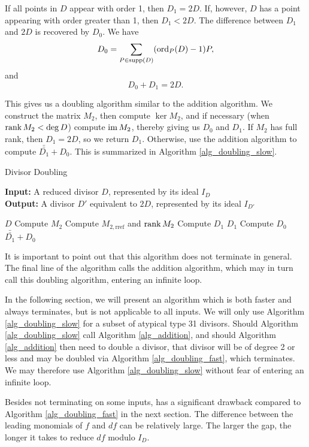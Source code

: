 If all points in $D$ appear with order 1, then $D_1 = 2D$.
If, however, $D$ has a point appearing with order greater than 1, then $D_1 < 2D$.
The difference between $D_1$ and $2D$ is recovered by $D_0$.
We have
\[ D_0 = \sum_{P \in \operatorname{supp}(D)} (\operatorname{ord}_P(D) - 1)P, \]
and
\[ D_0 + D_1 = 2D. \]

This gives us a doubling algorithm similar to the addition algorithm.
We construct the matrix $M_2$, then compute $\ker M_2$, and if necessary (when $\operatorname{rank} M_2 < \deg D$)
compute $\operatorname{im} M_2$, thereby giving us $D_0$ and $D_1$.
If $M_2$ has full rank, then $D_1 = 2D$, so we return $D_1$.
Otherwise, use the addition algorithm to compute $\bar{\bar{D_1}} + D_0$.
This is summarized in Algorithm \ref{alg_doubling_slow}.

\begin{algorithm}
  \caption{Divisor Doubling}
  \label{alg_doubling_slow}
  {\bf Input:} A reduced divisor $D$, represented by its ideal $I_D$ \\
  {\bf Output:} A divisor $D'$ equivalent to $2D$, represented by its ideal $I_{D'}$
  \begin{algorithmic}[1]
      \State \Return $D$
    \EndIf
    \State Compute $M_2$
    \State Compute $M_{2,\text{rref}}$ and $\operatorname{rank} M_2$
    \State Compute $D_1$
      \State \Return $D_1$
    \EndIf
    \State Compute $D_0$
    \State \Return $\bar{\bar{D_1}} + D_0$
  \end{algorithmic}
\end{algorithm}

It is important to point out that this algorithm does not terminate in general.
The final line of the algorithm calls the addition algorithm,
which may in turn call this doubling algorithm,
entering an infinite loop.

In the following section, we will present an algorithm which is both faster and always terminates,
but is not applicable to all inputs.
We will only use Algorithm \ref{alg_doubling_slow} for a subset of atypical type 31 divisors.
Should Algorithm \ref{alg_doubling_slow} call Algorithm \ref{alg_addition},
and should Algorithm \ref{alg_addition} then need to double a divisor,
that divisor will be of degree 2 or less and may be doubled via Algorithm \ref{alg_doubling_fast}, which terminates.
We may therefore use Algorithm \ref{alg_doubling_slow} without fear of entering an infinite loop.

Besides not terminating on some inputs, has a significant drawback
compared to Algorithm \ref{alg_doubling_fast} in the next section.
The difference between the leading monomials of $f$ and $df$ can be relatively large.
The larger the gap, the longer it takes to reduce $df$ modulo $I_D$.

